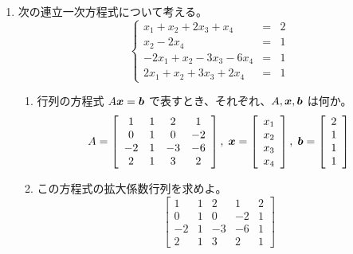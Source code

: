 \begin{enumerate}
\item 次の連立一次方程式について考える。
$$\left\{\begin{array}{ccc}
x_1 + x_2 + 2x_3 + x_4 & = & 2\\
x_2 -2x_4 & = & 1\\
-2x_1 + x_2 - 3x_3 -6x_4 & = & 1\\
2x_1 + x_2 + 3x_3 + 2x_4 & = & 1
\end{array}\right.$$
\begin{enumerate}
\item 行列の方程式 $A\mbox{\boldmath $x$} = \mbox{\boldmath $b$}$ で表すとき、それぞれ、$A, \mbox{\boldmath $x$}, \mbox{\boldmath $b$}$ は何か。\\
\sol 
$$A = \left[\begin{array}{cccc}
1 & 1 & 2 & 1\\
0 & 1 & 0 & -2 \\
-2 & 1 & -3 & -6 \\
2 & 1 & 3 & 2 
\end{array}\right], \;
\mbox{\boldmath $x$} = \left[\begin{array}{c}
x_1\\ x_2\\ x_3\\ x_4\end{array}\right],\;
\mbox{\boldmath $b$} = \left[\begin{array}{c}
2\\ 1\\ 1\\ 1\end{array}\right]$$

\item この方程式の拡大係数行列を求めよ。\\
\sol
$$\left[\begin{array}{ccccc}
1 & 1 & 2 & 1 & 2\\
0 & 1 & 0 & -2 & 1\\
-2 & 1 & -3 & -6 & 1\\
2 & 1 & 3 & 2 & 1
\end{array}\right]$$
\end{enumerate}


\end{enumerate}
